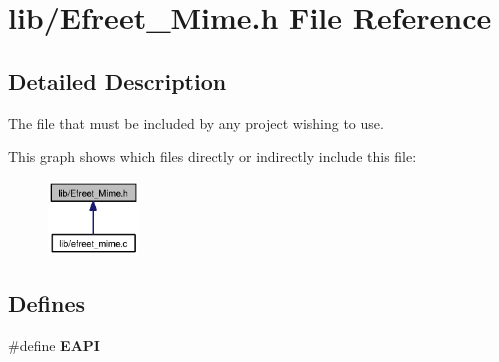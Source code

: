 \section{lib/Efreet\_\-Mime.h File Reference}
\label{Efreet__Mime_8h}


\subsection{Detailed Description}
The file that must be included by any project wishing to use. 





This graph shows which files directly or indirectly include this file:\nopagebreak
\begin{figure}[H]
\begin{center}
\leavevmode
\includegraphics[width=68pt]{Efreet__Mime_8h__dep__incl}
\end{center}
\end{figure}
\subsection*{Defines}
\begin{CompactItemize}
\item 
\#define {\bf EAPI}
\end{CompactItemize}
